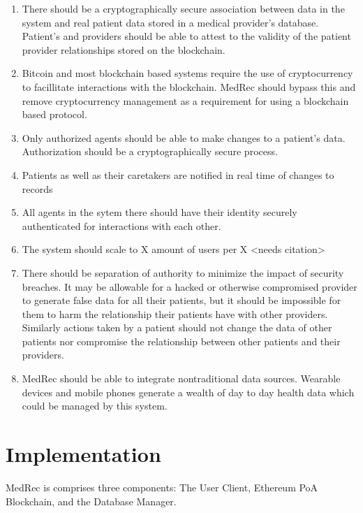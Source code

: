\documentclass[a4paper]{article}
\begin{document}
\begin{enumerate}
\item There should be a cryptographically secure association between data in the system and real patient data stored in a medical provider’s database. Patient's and providers should be able to attest to the validity of the patient provider relationships stored on the blockchain.

\item Bitcoin and most blockchain based systems require the use of cryptocurrency to facillitate interactions with the blockchain. MedRec should bypass this and remove cryptocurrency management as a requirement for using a blockchain based protocol.

\item Only authorized agents should be able to make changes to a patient’s data. Authorization should be a cryptographically secure process.

\item Patients as well as their caretakers are notified in real time of changes to records

\item All agents in the sytem there should have their identity securely authenticated for interactions with each other.

\item The system should scale to X amount of users per X <needs citation>

\item There should be separation of authority to minimize the impact of security breaches. It may be allowable for a hacked or otherwise compromised provider to generate false data for all their patients, but it should be impossible for them to harm the relationship their patients have with other providers. Similarly actions taken by a patient should not change the data of other patients nor compromise the relationship between other patients and their providers.

\item MedRec should be able to integrate nontraditional data sources. Wearable devices and mobile phones generate a wealth of day to day health data which could be managed by this system.

\end{enumerate}

\section{Implementation}

MedRec is comprises three components: The User Client, Ethereum PoA Blockchain, and the Database Manager.
\end{document}
